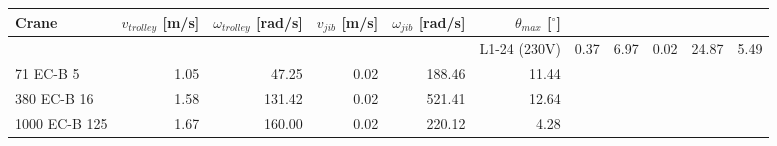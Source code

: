 \documentclass{standalone}
\begin{document}
\begin{tabular}{lrrrrrrr}\toprule
\textbf{Crane}& \textbf{$v_{trolley}$ [m/s]}& \textbf{$\omega_{trolley}$ [rad/s]}& \textbf{$v_{jib}$ [m/s]}& \textbf{$\omega_{jib}$ [rad/s]}& \textbf{$\theta_{max}$ [$^\circ$] } \\
\midrule      &                             &                                    &                         &                                &
L1-24 (230V)  & 0.37                        & 6.97                              & 0.02                    & 24.87                          & 5.49 \\
71 EC-B 5     & 1.05                        & 47.25                              & 0.02                    & 188.46                          & 11.44 \\
380 EC-B 16   & 1.58                        & 131.42                              & 0.02                    & 521.41                          & 12.64 \\
1000 EC-B 125 & 1.67                        & 160.00                              & 0.02                    & 220.12                          & 4.28 \\
    \bottomrule
\end{tabular}
\end{document}

